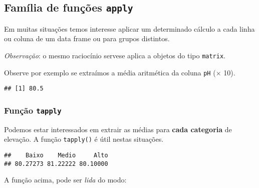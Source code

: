 \documentclass[
]{book}
\newenvironment{Shaded}{\begin{snugshade}}{\end{snugshade}}
\newcommand{\CommentTok}[1]{\textcolor[rgb]{0.56,0.35,0.01}{\textit{#1}}}
\newcommand{\KeywordTok}[1]{\textcolor[rgb]{0.13,0.29,0.53}{\textbf{#1}}}
\newcommand{\NormalTok}[1]{#1}
\newcommand{\OperatorTok}[1]{\textcolor[rgb]{0.81,0.36,0.00}{\textbf{#1}}}
\begin{document}
\hypertarget{famuxedlia-de-funuxe7uxf5es-apply}{%
\subsection{\texorpdfstring{Família de funções \texttt{apply}}{Família de funções apply}}\label{famuxedlia-de-funuxe7uxf5es-apply}}

Em muitas situações temos interesse aplicar um determinado cálculo a cada linha ou coluna de um data frame ou para grupos distintos.

\emph{Observação}: o mesmo raciocínio servese aplica a objetos do tipo \texttt{matrix}.

Observe por exemplo se extraímos a média aritmética da coluna \texttt{pH} (\(\times\) 10).

\begin{Shaded}
\end{Shaded}

\begin{verbatim}
## [1] 80.5
\end{verbatim}

\hypertarget{funuxe7uxe3o-tapply}{%
\subsubsection*{\texorpdfstring{Função \texttt{tapply}}{Função tapply}}\label{funuxe7uxe3o-tapply}}

Podemos estar interessados em extrair as médias para \textbf{cada categoria} de elevação. A função \texttt{tapply()} é útil nestas situações.

\begin{Shaded}
\end{Shaded}

\begin{verbatim}
##    Baixo    Medio     Alto 
## 80.27273 81.22222 80.10000
\end{verbatim}

A função acima, pode ser \emph{lida} do modo:
\end{document}
